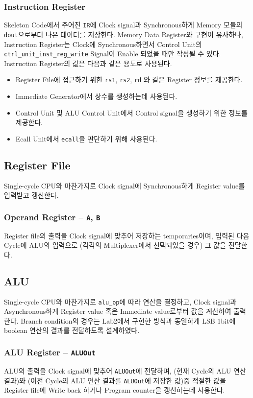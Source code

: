 \documentclass{scrartcl}
\begin{document}
\subsubsection{Instruction Register}
Skeleton Code에서 주어진 \texttt{IR}에 Clock signal과 Synchronous하게 Memory 모듈의 \texttt{dout}으로부터
나온 데이터를 저장한다. Memory Data Register와 구현이 유사하나, Instruction Register는 Clock에 Synchronous하면서
Control Unit의 \texttt{ctrl\_unit\_inst\_reg\_write} Signal이 Enable 되었을 때만 작성될 수 있다.
Instruction Register의 값은 다음과 같은 용도로 사용된다.
\begin{itemize}
  \item Register File에 접근하기 위한 \texttt{rs1}, \texttt{rs2}, \texttt{rd} 와 같은 Register 정보를 제공한다.
  \item Immediate Generator에서 상수를 생성하는데 사용된다.
  \item Control Unit 및 ALU Control Unit에서 Control signal을 생성하기 위한 정보를 제공한다.
  \item Ecall Unit에서 \texttt{ecall}을 판단하기 위해 사용된다.
\end{itemize}

\subsection{Register File}
Single-cycle CPU와 마찬가지로 Clock signal에 Synchronous하게 Register value를 입력받고 갱신한다.
\subsubsection{Operand Register -- \texttt{A}, \texttt{B}}
Register file의 출력을 Clock signal에 맞추어 저장하는 temporaries이며, 입력된 다음 Cycle에 ALU의 입력으로
(각각의 Multiplexer에서 선택되었을 경우) 그 값을 전달한다.

\subsection{ALU}
Single-cycle CPU와 마찬가지로 \texttt{alu\_op}에 따라 연산을 결정하고, Clock signal과 Asynchronous하게
Register value 혹은 Immediate value로부터 값을 계산하여 출력한다. Branch condition의 경우는 Lab2에서 구현한
방식과 동일하게 LSB 1bit에 boolean 연산의 결과를 전달하도록 설계하였다.

\subsubsection{ALU Register -- \texttt{ALUOut}}
ALU의 출력을 Clock signal에 맞추어 \texttt{ALUOut}에 전달하며, (현재 Cycle의 ALU 연산 결과)와
(이전 Cycle의 ALU 연산 결과를 \texttt{ALUOut}에 저장한 값)중 적절한 값을 Register file에 Write back
하거나 Program counter을 갱신하는데 사용한다.
\end{document}
